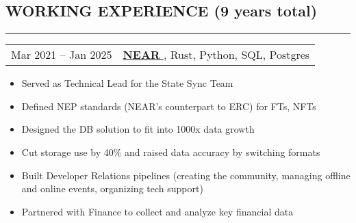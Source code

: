 \documentclass[11pt]{res} %
\let\orighref\href
\renewcommand{\href}[2]{\orighref{#1}{#2\,\faExternalLink}}
\begin{document}
\begin{resume}

        \section{\uppercase{Working Experience} (9 years total)}
        \begin{spacing}{0.3}
            \textcolor[RGB]{220,220,220}{\rule{\linewidth}{0.4pt}}
        \end{spacing}

         \begin{tabular}{ll}
            Mar 2021 -- Jan 2025 \qquad & \textbf{\href{https://near.org}{NEAR}}, Rust, Python, SQL, Postgres \\
        \end{tabular}

        \begin{itemize} \itemsep -2pt
            \item Served as Technical Lead for the State Sync Team
            \item Defined NEP standards (NEAR’s counterpart to ERC) for FTs, NFTs
            \item Designed the DB solution to fit into 1000x data growth
            \item Cut storage use by 40\% and raised data accuracy by switching formats
            \item Built Developer Relations pipelines (creating the community, managing offline and online events, organizing tech support)
            \item Partnered with Finance to collect and analyze key financial data
        \end{itemize}


\end{resume}
\end{document}
